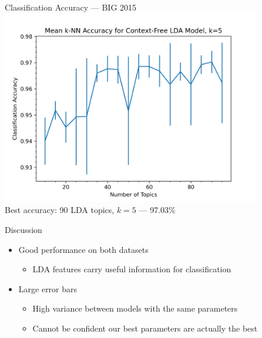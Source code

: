 \documentclass[handout,11pt]{beamer}
\begin{document}
	\begin{frame}{Classification Accuracy --- BIG 2015}
		\centering
		\includegraphics[width=0.85\textwidth]{img/msoft_big/knn_lda_k_05.png} \\
		Best accuracy: 90 LDA topics, $k=5$ --- 97.03\%
	\end{frame}
	\begin{frame}{Discussion}
		\begin{itemize}
			\item Good performance on both datasets
				\begin{itemize}
					\item LDA features carry useful information for classification
				\end{itemize}
			\item Large error bars
				\begin{itemize}
					\item High variance between models with the same parameters
					\item Cannot be confident our best parameters are actually the best
				\end{itemize}
		\end{itemize}
	\end{frame}
\end{document}
